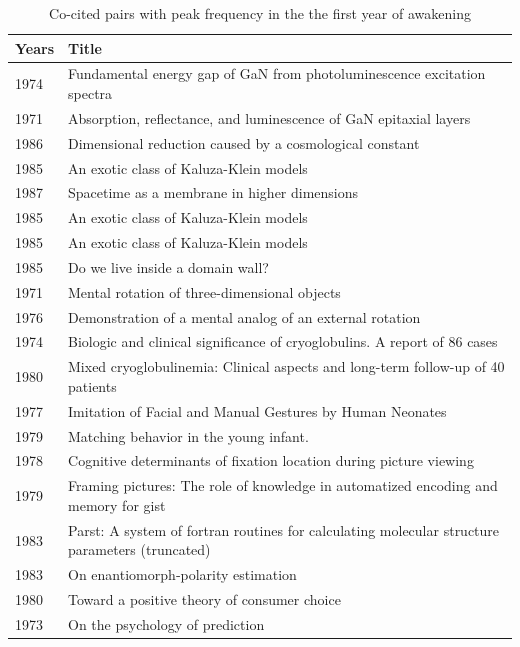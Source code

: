 \documentclass[11pt, oneside]{article}   	%
\begin{document}
\begin{table}[ht]
\caption{Co-cited pairs with peak frequency in the the first year of awakening}%
\centering %
\begin{center}
\begin{tabular}{ll} 
\hline %
Years & Title \\
\hline 
\tiny{1974} & \tiny{Fundamental energy gap of GaN from photoluminescence excitation spectra} \\
\tiny{1971} &  \tiny{Absorption, reflectance, and luminescence of GaN epitaxial layers} \\
\hline
\tiny{1986} & \tiny{Dimensional reduction caused by a cosmological constant} \\
\tiny{1985} & \tiny{An exotic class of Kaluza-Klein models} \\
\hline
\tiny{1987} & \tiny{Spacetime as a membrane in higher dimensions} \\
\tiny{1985} & \tiny{An exotic class of Kaluza-Klein models} \\
\hline 
\tiny{1985} & \tiny{An exotic class of Kaluza-Klein models} \\
\tiny{1985} & \tiny{Do we live inside a domain wall?} \\
\hline
\tiny{1971} & \tiny{Mental rotation of three-dimensional objects} \\
\tiny{1976} & \tiny{Demonstration of a mental analog of an external rotation} \\
\hline
\tiny{1974} & \tiny{Biologic and clinical significance of cryoglobulins. A report of 86 cases} \\
\tiny{1980} & \tiny{Mixed cryoglobulinemia: Clinical aspects and long-term follow-up of 40 patients} \\
\hline
\tiny{1977} & \tiny{Imitation of Facial and Manual Gestures by Human Neonates} \\
\tiny{1979} & \tiny{Matching behavior in the young infant.} \\ 
\hline
\tiny{1978} & \tiny{Cognitive determinants of fixation location during picture viewing} \\
\tiny{1979} & \tiny{Framing pictures: The role of knowledge in automatized encoding and memory for gist} \\
\hline
\tiny{1983} & \tiny{Parst: A system of fortran routines for calculating molecular structure parameters (truncated)} \\
\tiny{1983} & \tiny{On enantiomorph‐polarity estimation} \\
\hline
\tiny{1980} & \tiny{Toward a positive theory of consumer choice} \\
\tiny{1973} & \tiny{On the psychology of prediction} \\
\hline 
\end{tabular}
\end{center}
\label{tab:table3} %
\end{table}
\end{document}

